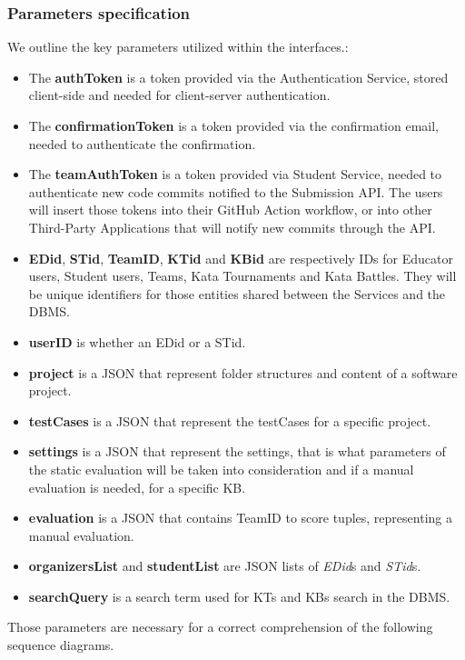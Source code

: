 \documentclass[11pt]{report}
\begin{document}
\subsubsection{Parameters specification} \label{sec:parameters_specification}
We outline the key parameters utilized within the interfaces.:
\begin{itemize}
    \item The \textbf{authToken} is a token provided via the Authentication Service, stored client-side and needed for client-server authentication.
    \item The \textbf{confirmationToken} is a token provided via the confirmation email, needed to authenticate the confirmation.
    \item The \textbf{teamAuthToken} is a token provided via Student Service, needed to authenticate new code commits notified to the Submission API. The users will insert those tokens into their GitHub Action workflow, or into other Third-Party Applications that will notify new commits through the API.
    \item \textbf{EDid}, \textbf{STid}, \textbf{TeamID}, \textbf{KTid} and \textbf{KBid} are respectively IDs for Educator users, Student users, Teams, Kata Tournaments and Kata Battles.
    They will be unique identifiers for those entities shared between the Services and the DBMS\@.
    \item \textbf{userID} is whether an EDid or a STid.
    \item \textbf{project} is a JSON that represent folder structures and content of a software project.
    \item \textbf{testCases} is a JSON that represent the testCases for a specific project.
    \item \textbf{settings} is a JSON that represent the settings, that is what parameters of the static evaluation will be taken into consideration and if a manual evaluation is needed, for a specific KB\@.
    \item \textbf{evaluation} is a JSON that contains TeamID to score tuples, representing a manual evaluation.
    \item \textbf{organizersList} and \textbf{studentList} are JSON lists of \emph{EDid}s and \emph{STid}s.
    \item \textbf{searchQuery} is a search term used for KTs and KBs search in the DBMS\@.
\end{itemize} 

Those parameters are necessary for a correct comprehension of the following sequence diagrams.
\end{document}
